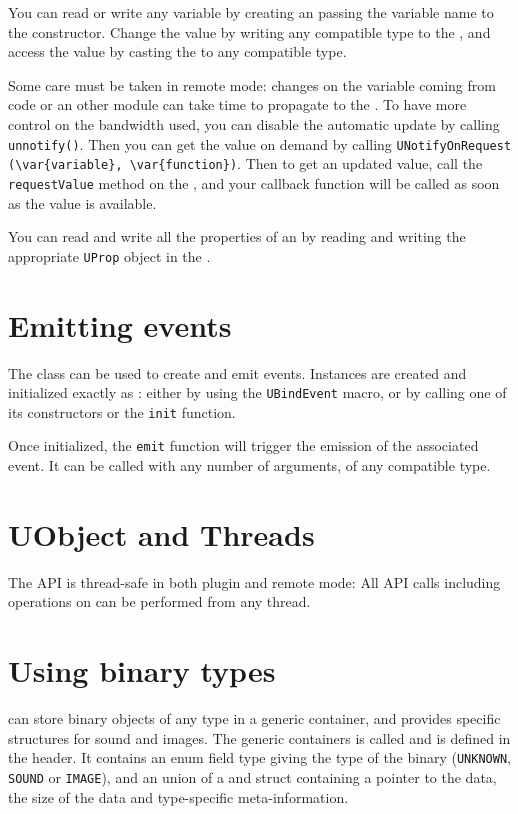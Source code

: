 You can read or write any \urbi variable by creating an
\UVar passing the variable name to the constructor. Change
the value by writing any compatible type to the \UVar, and
access the value by casting the \UVar to any compatible
type.

Some care must be taken in remote mode: changes on the
variable coming from \urbi code or an other module can take time to propagate
to the \UVar. To have more control on the bandwidth used, you can
disable the automatic update by calling \lstinline|unnotify()|. Then you can get
the value on demand by calling
\lstinline|UNotifyOnRequest (\var{variable}, \var{function})|. Then to get an
updated value, call the \lstinline{requestValue} method on the
\UVar, and your callback function will be called as soon as
the value is available.

You can read and write all the \urbi properties of an \UVar by
reading and writing the appropriate \lstinline{UProp} object in the
\UVar.

\section{Emitting events}

The \UEvent class can be used to create and emit \us events. Instances are
created and initialized exactly as \UVar: either by using the
\lstinline{UBindEvent} macro, or by calling one of its constructors or the
\lstinline{init} function.

Once initialized, the \lstinline{emit} function will trigger the emission of
the associated \us event. It can be called with any number of arguments, of
any compatible type.

\section{UObject and Threads}

The \UObject API is thread-safe in both plugin and remote mode: All API calls
including operations on \UVar can be performed from any thread.

\section{Using binary types}

\urbi can store binary objects of any type in a generic container, and
provides specific structures for sound and images. The generic
containers is called \UBinary and is defined in the
 header. It contains an enum field type
giving the type of the binary (\lstinline{UNKNOWN}, \lstinline{SOUND}
or \lstinline{IMAGE}), and an union of a \USound and
\UImage struct containing a pointer to the data, the size
of the data and type-specific meta-information.

